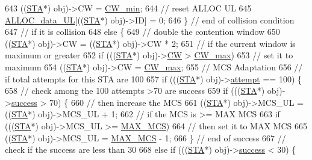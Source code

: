 \begin{DoxyCode}
{643             ((\hyperlink{classSTA}{STA}*) obj)->CW = \hyperlink{classAP_a02a0d02d7725c2b4ca51a3d6a88e677e}{CW\_min};
644             \textcolor{comment}{// reset ALLOC UL}
645             \hyperlink{classAP_ae5567916229fb09fbb83af3cfad5d71d}{ALLOC\_data\_UL}[((\hyperlink{classSTA}{STA}*) obj)->ID] = 0;
646         \} \textcolor{comment}{// end of collision condition}
647           \textcolor{comment}{// if it is collision}
648         \textcolor{keywordflow}{else} \{
649             \textcolor{comment}{// double the contention window}
650             ((\hyperlink{classSTA}{STA}*) obj)->CW = ((\hyperlink{classSTA}{STA}*) obj)->CW * 2;
651             \textcolor{comment}{// if the current window is maximum or greater}
652             \textcolor{keywordflow}{if} (((\hyperlink{classSTA}{STA}*) obj)->\hyperlink{classAP_a5f5fc6fd5279167b196a6387ff49825b}{CW} > \hyperlink{classAP_a3351a0a344c4a96a5a185aea2609fa7c}{CW\_max})
653                 \textcolor{comment}{// set it to maximum}
654                 ((\hyperlink{classSTA}{STA}*) obj)->CW = \hyperlink{classAP_a3351a0a344c4a96a5a185aea2609fa7c}{CW\_max};
655             \textcolor{comment}{// MCS Adaptation}
656             \textcolor{comment}{// if total attempts for this STA are 100}
657             \textcolor{keywordflow}{if} (((\hyperlink{classSTA}{STA}*) obj)->\hyperlink{classAP_aa15c857fb5fb5d7688f1ee49d43a2aee}{attempt} == 100) \{
658                 \textcolor{comment}{// check among the 100 attempts >70 are success}
659                 \textcolor{keywordflow}{if} (((\hyperlink{classSTA}{STA}*) obj)->\hyperlink{classAP_aa9d8130f487d3ba13dc6b22fe5e3868d}{success} > 70) \{
660                     \textcolor{comment}{// then increase the MCS}
661                     ((\hyperlink{classSTA}{STA}*) obj)->MCS\_UL = ((\hyperlink{classSTA}{STA}*) obj)->MCS\_UL + 1;
662                     \textcolor{comment}{// if the MCS is >= MAX MCS}
663                     \textcolor{keywordflow}{if} (((\hyperlink{classSTA}{STA}*) obj)->MCS\_UL >= \hyperlink{classAP_a1fe0d98f0db9557f18e560f8bc96c2fc}{MAX\_MCS})
664                         \textcolor{comment}{// then set it to MAX MCS}
665                         ((\hyperlink{classSTA}{STA}*) obj)->MCS\_UL = \hyperlink{classAP_a1fe0d98f0db9557f18e560f8bc96c2fc}{MAX\_MCS} - 1;
666                 \} \textcolor{comment}{// end of success}
667                   \textcolor{comment}{// check if the success are less than 30%
668                 \textcolor{keywordflow}{else} \textcolor{keywordflow}{if} (((\hyperlink{classSTA}{STA}*) obj)->\hyperlink{classAP_aa9d8130f487d3ba13dc6b22fe5e3868d}{success} < 30) \{
}}
\end{DoxyCode}
